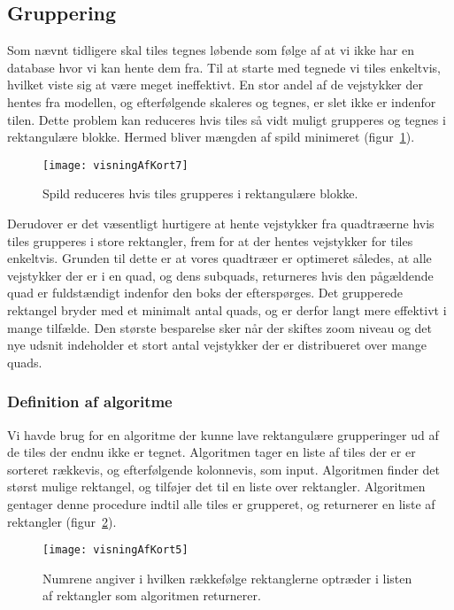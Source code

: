 \subsection{Gruppering}
\label{subsec:gruppering}

Som nævnt tidligere skal tiles tegnes løbende som følge af at vi ikke har en database hvor vi kan hente dem fra. Til at starte med tegnede vi tiles enkeltvis, hvilket viste sig at være meget ineffektivt. En stor andel af de vejstykker der hentes fra modellen, og efterfølgende skaleres og tegnes, er slet ikke er indenfor tilen. Dette problem kan reduceres hvis tiles så vidt muligt grupperes og tegnes i rektangulære blokke. Hermed bliver mængden af spild minimeret (figur~\ref{figur:visningAfKort7}).

\begin{figure}[h]
	\centering
	\texttt{[image: visningAfKort7]}
	\captionsetup{width=0.8\textwidth}
	\caption{Spild reduceres hvis tiles grupperes i rektangulære blokke.}
	\label{figur:visningAfKort7}
\end{figure}

Derudover er det væsentligt hurtigere at hente vejstykker fra quadtræerne hvis tiles grupperes i store rektangler, frem for at der hentes vejstykker for tiles enkeltvis. Grunden til dette er at vores quadtræer er optimeret således, at alle vejstykker der er i en quad, og dens subquads, returneres hvis den pågældende quad er fuldstændigt indenfor den boks der efterspørges. Det grupperede rektangel bryder med et minimalt antal quads, og er derfor langt mere effektivt i mange tilfælde. Den største besparelse sker når der skiftes zoom niveau og det nye udsnit indeholder et stort antal vejstykker der er distribueret over mange quads.

\subsubsection{Definition af algoritme}
\label{subsec:definitionAfAlgoritme}

Vi havde brug for en algoritme der kunne lave rektangulære grupperinger ud af de tiles der endnu ikke er tegnet. Algoritmen tager en liste af tiles der er er sorteret rækkevis, og efterfølgende kolonnevis, som input. Algoritmen finder det størst mulige rektangel, og tilføjer det til en liste over rektangler. Algoritmen gentager denne procedure indtil alle tiles er grupperet, og returnerer en liste af rektangler (figur~\ref{figur:visningAfKort5}).

\begin{figure}[h]
	\centering
	\texttt{[image: visningAfKort5]}
	\captionsetup{width=0.8\textwidth}
	\caption{Numrene angiver i hvilken rækkefølge rektanglerne optræder i listen af rektangler som algoritmen returnerer.}
	\label{figur:visningAfKort5}
\end{figure}

